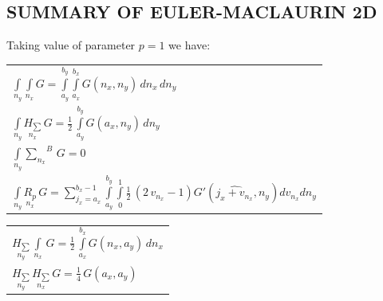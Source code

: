 \documentclass[twoside, 10pt, ptm]{article}
\def\myvspacebeforesubsection{-2.0mm}
\def\myvspaceaftersubsection{-2.5mm}
\begin{document}
\begin{multicols}{2}

\vspace{\myvspacebeforesubsection}
    \subsection*{\centering\uppercase{Summary of Euler-Maclaurin
2D}}\label{summary-of-eulermaclaurin-2d}
\vspace{\myvspaceaftersubsection}


Taking value of parameter \(p = 1\) we have:

    \begin{center}
\begin{tabular}{ l }

$\int\limits_{n_y}^{} \int\limits_{n_x}^{} G = \int\limits_{a_{y}}^{b_{y}} \int\limits_{a_{x}}^{b_{x}} G\left(n_{x}, n_{y}\right)\,{d n_{x}}\,{d n_{y}}$ \\

$\int\limits_{n_y}^{} \underset{n_x}{H_{\sum}}\,G = \frac{1}{2} \, \int\limits_{a_{y}}^{b_{y}} G\left(a_{x}, n_{y}\right)\,{d n_{y}}$ \\

$\int\limits_{n_y}^{} {\sum\limits_{n_x}^{}}^{B}\,G = 0$ \\

$\int\limits_{n_y}^{} \underset{n_x}{R_{p}}\,G = {\sum\limits_{j_{x}=a_{x}}^{b_{x} - 1} \int\limits_{a_{y}}^{b_{y}} \int\limits_{0}^{1} \frac{1}{2} \, {\left(2 \, v_{n_{x}} - 1\right)} G'\left(\widehat{j_{x} + v_{n_{x}}}, n_{y}\right){d v_{n_{x}}}{d n_{y}}}$ \\


\end{tabular}
\end{center}

    \begin{center}
\begin{tabular}{ l }


$\underset{n_y}{H_{\sum}}\,\int\limits_{n_x}^{}\,G = \frac{1}{2} \, \int\limits_{a_{x}}^{b_{x}} G\left(n_{x}, a_{y}\right)\,{d n_{x}}$ \\

$\underset{n_y}{H_{\sum}}\,\underset{n_x}{H_{\sum}}\,G = \frac{1}{4} \, G\left(a_{x}, a_{y}\right)$ \\


\end{tabular}
\end{center}
\end{multicols}
\end{document}
